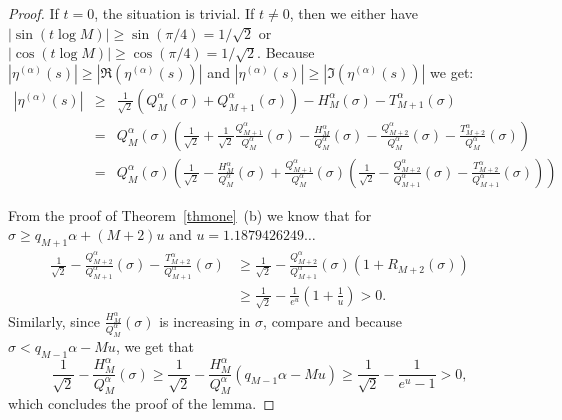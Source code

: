 \documentclass{amsart}
\theoremstyle{plain}
\theoremstyle{definition}
\newcommand{\etalpha}{\eta^{(\alpha)}}
\newcommand{\mc}{u}
\newcommand{\fixme}[1]{{\color{purple}FIXME: #1}}
\newcommand{\ourref}[2]{#1~\ref{#2}}
\begin{document}
\begin{proof}
If $t = 0$, the situation is trivial.  
If $t\ne 0$, then we either have $|\sin(t\log M)|\ge\sin(\pi/4)=1/\sqrt{2}$ or $|\cos(t\log M)|\ge\cos(\pi/4)=1/\sqrt{2}$.
Because $|\etalpha(s)|\ge |\Re(\etalpha(s))|$ and $|\etalpha(s)|\ge |\Im(\etalpha(s))|$ we get:
\begin{eqnarray*}
|\etalpha(s)|
&\!\!\!\ge\!\!\!& \frac{1}{\sqrt{2}}\left(Q_M^\alpha(\sigma)+Q_{M+1}^\alpha(\sigma)\right)-H_M^\alpha(\sigma)-T_{M+1}^\alpha(\sigma)\\
&\!\!\!=\!\!\!&   Q_M^\alpha(\sigma)\left(\frac{1}{\sqrt{2}}+\frac{1}{\sqrt{2}}\frac{Q_{M+1}^\alpha}{Q_M^\alpha}(\sigma)
-\frac{H_M^\alpha}{Q_M^\alpha}(\sigma)-\frac{Q_{M+2}^\alpha}{Q_M^\alpha}(\sigma)-\frac{T_{M+2}^\alpha}{Q_M^\alpha}(\sigma)\right)\\
&\!\!\!=\!\!\!&   Q_M^\alpha(\sigma)\!\left(\!\frac{1}{\sqrt{2}}-\frac{H_M^\alpha}{Q_M^\alpha}(\sigma)
+\frac{Q_{M+1}^\alpha}{Q_M^\alpha}(\sigma)\!
\left(\!\frac{1}{\sqrt{2}}-\frac{Q_{M+2}^\alpha}{Q_{M+1}^\alpha}(\sigma)-\frac{T_{M+2}^\alpha}{Q_{M+1}^\alpha}(\sigma)\!\right)\!\!\right)
\end{eqnarray*}

From the proof of \ourref{Theorem}{thmone}~(b) we know that for $\sigma\ge q_{M+1}\alpha+(M+2)\mc$
and $\mc=1.1879426249\dots$ 
\begin{align*}
\frac{1}{\sqrt{2}}-\frac{Q_{M+2}^\alpha}{Q_{M+1}^\alpha}(\sigma)-\frac{T_{M+2}^\alpha}{Q_{M+1}^\alpha}(\sigma)
&\ge\frac{1}{\sqrt{2}} -\frac{Q_{M+2}^\alpha}{Q_{M+1}^\alpha}(\sigma)\left(1+R_{M+2}(\sigma)\right)\\
&\ge\frac{1}{\sqrt{2}} - \frac{1}{e^\mc}\left(1+\frac{1}{\mc}\right) > 0.
\end{align*}
Similarly, since $\frac{H_M^\alpha}{Q_M^\alpha}(\sigma)$ is increasing in $\sigma$, compare \cite[Proof of Theorem 1 (b)]{zero-free-fract}
and because $\sigma<q_{M-1}\alpha-M\mc$, we get that
\[
\frac{1}{\sqrt{2}}-\frac{H_M^\alpha}{Q_M^\alpha}(\sigma)\ge\frac{1}{\sqrt{2}}-\frac{H_M^\alpha}{Q_M^\alpha}(q_{M-1}\alpha-M\mc)\ge\frac{1}{\sqrt{2}}-\frac{1}{e^\mc-1}>0,
\]
which concludes the proof of the lemma.
\end{proof}
\end{document}
